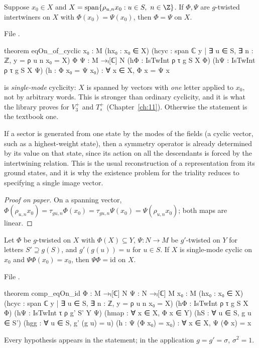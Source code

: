\begin{theorem}[Uniqueness]\label{ch12:thm:eqOn_of_cyclic}
Suppose $x_0\in X$ and $X=\operatorname{span}\{\rho_{u,n}x_0:u\in S,\ n\in\Z\}$.  If $\Phi,\Psi$ are
$g$-twisted intertwiners on $X$ with $\Phi(x_0)=\Psi(x_0)$, then $\Phi=\Psi$ on $X$.
\end{theorem}
File .
\begin{leancode}
theorem eqOn_of_cyclic {x₀ : M} (hx₀ : x₀ ∈ X)
    (hcyc : span ℂ {y | ∃ u ∈ S, ∃ n : ℤ, y = ρ u n x₀} = X) {Φ Ψ : M →ₗ[ℂ] N}
    (hΦ : IsTwInt ρ τ g S X Φ) (hΨ : IsTwInt ρ τ g S X Ψ) (h : Φ x₀ = Ψ x₀) :
    ∀ x ∈ X, Φ x = Ψ x
\end{leancode}
\begin{dictionary}
 is \emph{single-mode} cyclicity: $X$ is spanned by vectors with \emph{one} letter applied to
$x_0$, not by arbitrary words.  This is stronger than ordinary cyclicity, and it is what the library
proves for $V_3^+$ and $T_s^+$ (Chapter~\ref{ch:11}).  Otherwise the statement is the textbook one.
\end{dictionary}

\begin{physics}
If a sector is generated from one state by the modes of the fields (a cyclic vector, such as a highest-weight state), then a symmetry operator is already determined by its value on that state, since its action on all the descendants is forced by the intertwining relation. This is the usual reconstruction of a representation from its ground states, and it is why the existence problem for the triality reduces to specifying a single image vector.
\end{physics}
\begin{proof}[Proof on paper]
On a spanning vector, $\Phi(\rho_{u,n}x_0)=\tau_{gu,n}\Phi(x_0)=\tau_{gu,n}\Psi(x_0)=\Psi(\rho_{u,n}x_0)$; both
maps are linear.
\end{proof}

\begin{theorem}\label{ch12:thm:comp_eqOn_id}
Let $\Phi$ be $g$-twisted on $X$ with $\Phi(X)\subseteq Y$, $\Psi:N\to M$ be $g'$-twisted on $Y$ for letters
$S'\supseteq g(S)$, and $g'(g(u))=u$ for $u\in S$.  If $X$ is single-mode cyclic on $x_0$ and
$\Psi\Phi(x_0)=x_0$, then $\Psi\Phi=\mathrm{id}$ on $X$.
\end{theorem}
File .
\begin{leancode}
theorem comp_eqOn_id {Φ : M →ₗ[ℂ] N} {Ψ : N →ₗ[ℂ] M} {x₀ : M} (hx₀ : x₀ ∈ X)
    (hcyc : span ℂ {y | ∃ u ∈ S, ∃ n : ℤ, y = ρ u n x₀} = X)
    (hΦ : IsTwInt ρ τ g S X Φ) (hΨ : IsTwInt τ ρ g' S' Y Ψ) (hmap : ∀ x ∈ X, Φ x ∈ Y)
    (hS : ∀ u ∈ S, g u ∈ S') (hgg : ∀ u ∈ S, g' (g u) = u) (h : Ψ (Φ x₀) = x₀) :
    ∀ x ∈ X, Ψ (Φ x) = x
\end{leancode}
\begin{dictionary}Every hypothesis appears in the statement; in the application $g=g'=\sigma$, $\sigma^2=1$.\end{dictionary}

